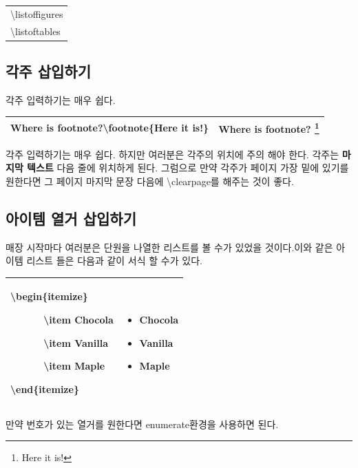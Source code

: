 \documentclass[12pt]{article}
\begin{document}
	\begin{tabularx}{\textwidth \onehalfspacing}{|X|}
		\hline
		\textbackslash listoffigures\\
		\textbackslash listoftables\\
		\hline
	\end{tabularx}
	\subsection{각주 삽입하기}
	각주 입력하기는 매우 쉽다.\\
	
	\begin{tabularx}{\textwidth \onehalfspacing}{|X|X|}
		\hline
		Where is footnote?\textbackslash footnote\{Here it is!\}&Where is footnote? \footnote{Here it is!}\\
		\hline
	\end{tabularx}
	\newline\newline
	각주 입력하기는 매우 쉽다. 하지만 여러분은 각주의 위치에 주의 해야 한다. 각주는 \textbf{마지막 텍스트} 다음 줄에 위치하게 된다. 그럼으로 만약 각주가 페이지 가장 밑에 있기를 원한다면 그 페이지 마지막 문장 다음에 \textbackslash clearpage를 해주는 것이 좋다.\clearpage
	\subsection{아이템 열거 삽입하기}
	매장 시작마다 여러분은 단원을 나열한 리스트를 볼 수가 있었을 것이다.이와 같은 아이템 리스트 들은 다음과 같이 서식 할 수가 있다.\newline
	
	\begin{tabularx}{\textwidth \onehalfspacing}{|X|X|}
		\hline
		\textbackslash begin\{itemize\}
		
		\ \ \ \ \ \ \textbackslash item Chocola
		
		\ \ \ \ \ \ \textbackslash item Vanilla
		
		\ \ \ \ \ \ \textbackslash item Maple
		
		\textbackslash end\{itemize\}
		&
		\begin{itemize}
			\item Chocola
			\item Vanilla
			\item Maple
		\end{itemize}
		\\
		\hline
	\end{tabularx}
	\newline\newline
	만약 번호가 있는 열거를 원한다면 enumerate환경을 사용하면 된다.\newline
	
\end{document}
